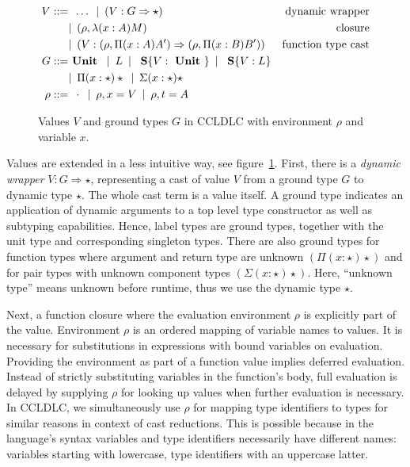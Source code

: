 \begin{figure}
\begin{align*}
 V ::= & \enspace \dots \enspace
        |\enspace (V : G \Rightarrow \star) & \text{dynamic wrapper}\\
      & |\enspace (\rho, \lambda(x:A)M) & \text{closure} \\
      & |\enspace (V : (\rho, \Pi(x:A) A') \Rightarrow (\rho, \Pi(x:B) B') ) & \text{function type cast} \\
 G ::= & \text{ \textbf{Unit} } \enspace|\enspace
    L \enspace|\enspace
    \text{ \textbf{S}}\{V: \text{ \textbf{Unit} }\} \enspace|\enspace
    \text{ \textbf{S}}\{V: L\} \\
    & |\enspace
    \Pi(x:\star)\star \enspace|\enspace
    \Sigma(x:\star)\star \\
 \rho ::= & \enspace \cdot \enspace|\enspace \rho, x = V  \enspace|\enspace \rho,t = A
\end{align*}
\caption[Values $V$ and ground types $G$ in CCLDLC]{Values $V$ and ground types $G$ in CCLDLC with environment $\rho$ and variable $x$.}
\label{fig:ccldlc-extensions-values}
\end{figure}

Values are extended in a less intuitive way, see figure~\ref{fig:ccldlc-extensions-values}. First, there is a \emph{dynamic wrapper} $V : G \Rightarrow \star$, representing a cast of value $V$ from a ground type $G$ to dynamic type $\star$. The whole cast term is a value itself. A ground type indicates an application of dynamic arguments to a top level type constructor as well as subtyping capabilities. Hence, label types are ground types, together with the unit type and corresponding singleton types. There are also ground types for function types where argument and return type are unknown $(\Pi(x:\star)\star)$ and for pair types with unknown component types $(\Sigma(x:\star)\star)$. Here, ``unknown type'' means unknown before runtime, thus we use the dynamic type $\star$.

Next, a function closure where the evaluation environment $\rho$ is explicitly part of the value. Environment $\rho$ is an ordered mapping of variable names to values. It is necessary for substitutions in expressions with bound variables on evaluation. Providing the environment as part of a function value implies deferred evaluation. Instead of strictly substituting variables in the function's body, full evaluation is delayed by supplying $\rho$ for looking up values when further evaluation is necessary. In CCLDLC, we simultaneously use $\rho$ for mapping type identifiers to types for similar reasons in context of cast reductions. This is possible because in the language's syntax variables and type identifiers necessarily have different names: variables starting with lowercase, type identifiers with an uppercase latter.


